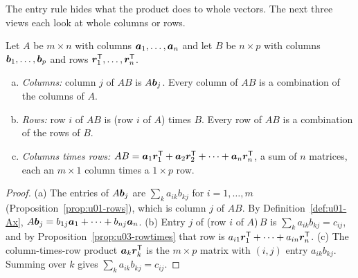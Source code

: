 The entry rule hides what the product does to whole vectors. The next three views each look at
whole columns or rows.

\begin{proposition}\label{prop:u04-views}
Let $A$ be $m\times n$ with columns $\boldsymbol{a}_1,\dots,\boldsymbol{a}_n$ and let $B$ be $n\times p$ with
columns $\boldsymbol{b}_1,\dots,\boldsymbol{b}_p$ and rows $\boldsymbol{r}_1^{\mathsf{T}},\dots,\boldsymbol{r}_n^{\mathsf{T}}$.
\begin{enumerate}[(a)]
  \item \emph{Columns:} column $j$ of $AB$ is $A\boldsymbol{b}_j$. Every column of $AB$ is a
    combination of the columns of $A$.
  \item \emph{Rows:} row $i$ of $AB$ is (row $i$ of $A$) times $B$. Every row of $AB$ is a
    combination of the rows of $B$.
  \item \emph{Columns times rows:} $AB=\boldsymbol{a}_1\boldsymbol{r}_1^{\mathsf{T}}+\boldsymbol{a}_2\boldsymbol{r}_2^{\mathsf{T}}+\cdots+\boldsymbol{a}_n\boldsymbol{r}_n^{\mathsf{T}}$,
    a sum of $n$ matrices, each an $m\times1$ column times a $1\times p$ row.
\end{enumerate}
\end{proposition}

\begin{proof}
(a) The entries of $A\boldsymbol{b}_j$ are $\sum_k a_{ik}b_{kj}$ for $i=1,\dots,m$
(Proposition~\ref{prop:u01-rows}), which is column $j$ of $AB$. By
Definition~\ref{def:u01-Ax}, $A\boldsymbol{b}_j=b_{1j}\boldsymbol{a}_1+\cdots+b_{nj}\boldsymbol{a}_n$.
(b) Entry $j$ of (row $i$ of $A$)$\,B$ is $\sum_k a_{ik}b_{kj}=c_{ij}$, and by
Proposition~\ref{prop:u03-rowtimes} that row is $a_{i1}\boldsymbol{r}_1^{\mathsf{T}}+\cdots+a_{in}\boldsymbol{r}_n^{\mathsf{T}}$.
(c) The column-times-row product $\boldsymbol{a}_k\boldsymbol{r}_k^{\mathsf{T}}$ is the $m\times p$ matrix with $(i,j)$
entry $a_{ik}b_{kj}$. Summing over $k$ gives $\sum_k a_{ik}b_{kj}=c_{ij}$.
\end{proof}

